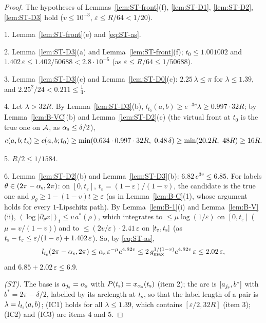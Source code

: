 \begin{proof}
The hypotheses of Lemmas~\ref{lem:ST-front}(f), \ref{lem:ST-D1}, \ref{lem:ST-D2}, \ref{lem:ST-D3} hold ($v\le10^{-3}$,
$\varepsilon\le R/64<1/20$).

1. Lemma~\ref{lem:ST-front}(e) and \eqref{eq:ST-as}.

2. Lemma~\ref{lem:ST-D3}(a) and Lemma~\ref{lem:ST-front}(f); $t_0\le1.001002$ and $1.402\,\varepsilon\le1.402/50688<2.8\cdot10^{-5}$
(as $\varepsilon\le R/64\le1/50688$).

3. Lemma~\ref{lem:ST-D3}(c) and Lemma~\ref{lem:ST-D0}(c): $2.25\,\lambda\le\pi$ for $\lambda\le1.39$, and
$2.25^2/24<0.211\le\frac14$.

4. Let $\lambda>32R$. By Lemma~\ref{lem:ST-D3}(b), $l_{t_0}(a,b)\ge e^{-3v}\lambda\ge0.997\cdot32R$; by Lemma~\ref{lem:B-VC}(b) and
Lemma~\ref{lem:ST-D2}(c) (the virtual front at $t_0$ is the true one on $\mathcal A$, as $\alpha_{\mathrm s}\le\delta/2$),
\[
c(a,b;\Bts)\ge c(a,b;t_0)\ge\min(0.634\cdot0.997\cdot32R,\ 0.48\,\delta)\ge\min(20.2R,\ 48R)\ge16R .
\]

5. $R/2\le1/1584$.

6. Lemma~\ref{lem:ST-D2}(b) and Lemma~\ref{lem:ST-D3}(b): $6.82\,e^{3v}\le6.85$. For labels $\theta\in(2\pi-\alpha_{\mathrm s},2\pi)$: on
$[0,t_\varepsilon]$, $t_\varepsilon=(1-\varepsilon)/(1-v)$, the candidate is the true one and $\rho_\theta\ge1-(1-v)t\ge\varepsilon$ (as in
Lemma~\ref{lem:B-C}(1), whose argument holds for every $1$-Lipschitz path). By Lemma~\ref{lem:B-1}(i) and Lemma~\ref{lem:B-V}(ii),
$(\log|\partial_\theta x|)_t\le v\,a^*(\rho)$, which integrates to $\le\mu\log(1/\varepsilon)$ on $[0,t_\varepsilon]$ ($\mu=v/(1-v)$) and
to $\le(2v/\varepsilon)\cdot2.41\,\varepsilon$ on $[t_\varepsilon,t_{\mathrm s}]$ (as $t_{\mathrm s}-t_\varepsilon\le\varepsilon/(1-v)+1.402\,\varepsilon$).
So, by \eqref{eq:ST-as},
\[
l_{t_{\mathrm s}}(2\pi-\alpha_{\mathrm s},2\pi)\le\alpha_{\mathrm s}\,\varepsilon^{-\mu}e^{4.82v}\le2\,g_{\max}^{1/(1-v)}e^{4.82v}\,\varepsilon\le2.02\,\varepsilon ,
\]
and $6.85+2.02\,\varepsilon\le6.9$.

\emph{\textup{(ST)}.} The base is $a_{j_{\mathrm s}}=\alpha_{\mathrm s}$ with $P(t_{\mathrm s})=x_{\alpha_{\mathrm s}}(t_{\mathrm s})$ (item 2); the arc is $[a_{j_{\mathrm s}},b^*]$ with
$b^*=2\pi-\delta/2$, labelled by its arclength at $t_{\mathrm s}$, so that the label length of a pair is $\lambda=l_{t_{\mathrm s}}(a,b)$; (IC1) holds
for all $\lambda\le1.39$, which contains $[\varepsilon/2,32R]$ (item 3); (IC2) and (IC3) are items 4 and 5.
\end{proof}

